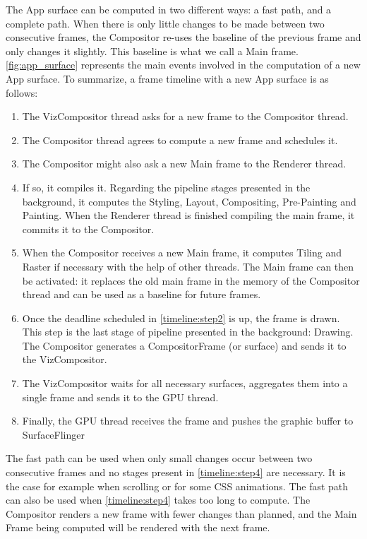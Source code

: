 \documentclass{kththesis}
\begin{document}
The App surface can be computed in two different ways: a fast path, and a complete path. When there is only little changes to be made between two consecutive frames, the Compositor re-uses the baseline of the previous frame and only changes it slightly. This baseline is what we call a Main frame.
\autoref{fig:app_surface} represents the main events involved in the computation of a new App surface. To summarize, a frame timeline with a new App surface is as follows:
\begin{enumerate}[ref={Step}\xspace\arabic*]
    \item \label{timeline:step1} The VizCompositor thread asks for a new frame to the Compositor thread.
    \item \label{timeline:step2} The Compositor thread agrees to compute a new frame and schedules it.
    \item \label{timeline:step3}The Compositor might also ask a new Main frame to the Renderer thread.
    \item \label{timeline:step4}If so, it compiles it. Regarding the pipeline stages presented in the background, it computes the Styling, Layout, Compositing, Pre-Painting and Painting. When the Renderer thread is finished compiling the main frame, it commits it to the Compositor.
    \item \label{timeline:step5}When the Compositor receives a new Main frame, it computes Tiling and Raster if necessary with the help of other threads. The Main frame can then be activated: it replaces the old main frame in the memory of the Compositor thread and can be used as a baseline for future frames.
    \item \label{timeline:step6} Once the deadline scheduled in \ref{timeline:step2} is up, the frame is drawn. This step is the last stage of pipeline presented in the background: Drawing. The Compositor generates a CompositorFrame (or surface) and sends it to the VizCompositor.
    \item \label{timeline:step7}The VizCompositor waits for all necessary surfaces, aggregates them into a single frame and sends it to the GPU thread.
    \item \label{timeline:step8}Finally, the GPU thread receives the frame and pushes the graphic buffer to SurfaceFlinger
\end{enumerate}

The fast path can be used when only small changes occur between two consecutive frames and no stages present in \ref{timeline:step4} are necessary. It is the case for example when scrolling or for some CSS animations. The fast path can also be used when \ref{timeline:step4} takes too long to compute. The Compositor renders a new frame with fewer changes than planned, and the Main Frame being computed will be rendered with the next frame.
\end{document}
